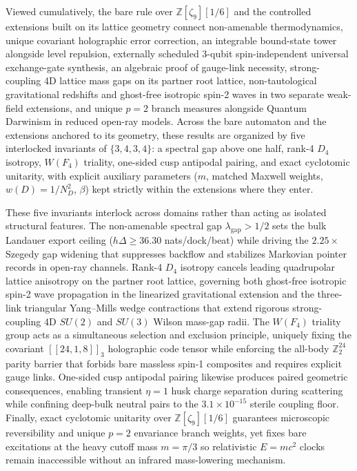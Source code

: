 Viewed cumulatively, the bare rule over $\mathbb{Z}[\zeta_9][1/6]$ and the controlled extensions built on its lattice
geometry connect non-amenable thermodynamics, unique covariant holographic error correction, an integrable bound-state
tower alongside level repulsion, externally scheduled 3-qubit spin-independent universal exchange-gate synthesis, an
algebraic proof of gauge-link necessity, strong-coupling 4D lattice mass gaps on its partner root lattice,
non-tautological gravitational redshifts and ghost-free isotropic spin-2 waves in two separate weak-field extensions, and unique $p = 2$ branch
measures alongside Quantum Darwinism in reduced open-ray models. Across the bare automaton and the extensions anchored
to its geometry, these results are organized by five interlocked invariants of $\{3,4,3,4\}$: a spectral gap above one
half, rank-4 $D_4$ isotropy, $W(F_4)$ triality, one-sided cusp antipodal pairing, and exact cyclotomic unitarity, with
explicit auxiliary parameters ($m$, matched Maxwell weights, $w(D) = 1/N_D^2$, $\beta$) kept strictly within the
extensions where they enter.

These five invariants interlock across domains rather than acting as isolated structural features. The non-amenable
spectral gap $\lambda_{\mathrm{gap}} > 1/2$ sets the bulk Landauer export ceiling ($h\Delta \ge 36.30$ nats/dock/beat)
while driving the $2.25\times$ Szegedy gap widening that suppresses backflow and stabilizes Markovian pointer records in
open-ray channels. Rank-4 $D_4$ isotropy cancels leading quadrupolar lattice anisotropy on the partner root lattice,
governing both ghost-free isotropic spin-2 wave propagation in the linearized gravitational extension and the three-link
triangular Yang--Mills wedge contractions that extend rigorous strong-coupling 4D $SU(2)$ and $SU(3)$ Wilson mass-gap
radii. The $W(F_4)$ triality group acts as a simultaneous selection and exclusion principle, uniquely fixing the
covariant $[[24, 1, 8]]_3$ holographic code tensor while enforcing the all-body $\mathbb{Z}_2^{24}$ parity barrier that
forbids bare massless spin-1 composites and requires explicit gauge links. One-sided cusp antipodal pairing likewise
produces paired geometric consequences, enabling transient $\eta = 1$ husk charge separation during scattering while
confining deep-bulk neutral pairs to the $3.1 \times 10^{-15}$ sterile coupling floor. Finally, exact cyclotomic
unitarity over $\mathbb{Z}[\zeta_9][1/6]$ guarantees microscopic reversibility and unique $p = 2$ envariance branch
weights, yet fixes bare excitations at the heavy cutoff mass $m = \pi/3$ so relativistic $E = mc^2$ clocks remain
inaccessible without an infrared mass-lowering mechanism.

